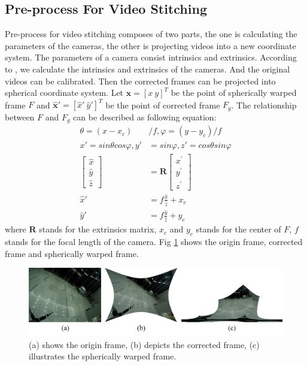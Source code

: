 \documentclass[conference]{IEEEtran}
\begin{document}
\subsection{Pre-process For Video Stitching}
\label{ssec:Pre-prepared}
Pre-process for video stitching composes of two parts, the one is calculating the parameters of the cameras, the other is projecting videos into a new coordinate
system. The parameters of a camera consist intrinsics and extrinsics. 
According to \cite{zhang2000flexible}, we calculate the intrinsics and extrinsics of the cameras. And the original videos can be calibrated.
Then the corrected frames can be projected into spherical coordinate system.
Let $\textbf{x} = [x \ y]^T$ be the point of spherically
warped frame $F$ and $\hat{\textbf{x}}' = [\hat{x}' \ \hat{y}']^T$ be the point of corrected frame $F_g$.
The relationship between $F$ and $F_g$ can be described as following equation:
\begin{equation}
\begin{aligned}
\theta =\left(x-x_{c}\right) &/ f , \varphi =\left(y -y_{c}\right) / f \\
x'=sin\theta cos\varphi, y'&=sin\varphi, z'=cos\theta sin\varphi \\
\left[ \begin{array}{l}{\hat{x}} \\ {\hat{y}} \\ {\hat{z}}\end{array}\right]&=\textbf{R} \left[ \begin{array}{l}{x^{\prime}} \\ {y^{\prime}} \\ {z^{\prime}}\end{array}\right]\\
\hat{x}'&=f\frac{\hat{x}}{\hat{z}}+x_c\\
\hat{y}'&=f\frac{\hat{y}}{\hat{z}}+y_c
\end{aligned}
\end{equation}
where $\textbf{R}$ stands for the extrinsics matrix, $x_c$ and $y_c$ stands for the center of $F$, $f$ stands for the focal length of the camera.
Fig \ref{fig:ori_cal_pro} shows the origin frame, 
corrected frame and spherically warped frame. 

\begin{figure}[t]
\centering
\includegraphics[scale=0.23]{picture40.png}
\caption{(a) shows the origin frame, (b) depicts the corrected frame, (c) illustrates the spherically warped frame.}
\label{fig:ori_cal_pro}
\end{figure}
\end{document}
